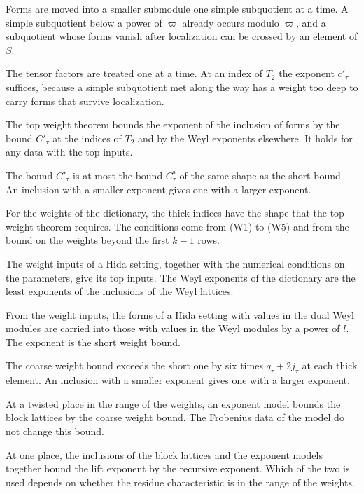 Forms are moved into a smaller submodule one simple subquotient at a time. A simple subquotient below a
power of $\varpi$ already occurs modulo $\varpi$, and a subquotient whose forms vanish after localization
can be crossed by an element of $S$.

The tensor factors are treated one at a time. At an index of $T_2$ the exponent $c'_\tau$ suffices,
because a simple subquotient met along the way has a weight too deep to carry forms that survive
localization.

The top weight theorem bounds the exponent of the inclusion of forms by the bound $C'_\tau$ at the
indices of $T_2$ and by the Weyl exponents elsewhere. It holds for any data with the top inputs.

The bound $C'_\tau$ is at most the bound $C^{\mathrm s}_\tau$ of the same shape as the short bound. An
inclusion with a smaller exponent gives one with a larger exponent.

For the weights of the dictionary, the thick indices have the shape that the top weight theorem
requires. The conditions come from (W1) to (W5) and from the bound on the weights beyond the first
$k-1$ rows.

The weight inputs of a Hida setting, together with the numerical conditions on the parameters, give
its top inputs. The Weyl exponents of the dictionary are the least exponents of the inclusions of the
Weyl lattices.

From the weight inputs, the forms of a Hida setting with values in the dual Weyl modules are carried
into those with values in the Weyl modules by a power of $l$. The exponent is the short weight bound.

The coarse weight bound exceeds the short one by six times $q_\tau+2j_\tau$ at each thick element. An
inclusion with a smaller exponent gives one with a larger exponent.

At a twisted place in the range of the weights, an exponent model bounds the block lattices by the
coarse weight bound. The Frobenius data of the model do not change this bound.

At one place, the inclusions of the block lattices and the exponent models together bound the lift
exponent by the recursive exponent. Which of the two is used depends on whether the residue
characteristic is in the range of the weights.

